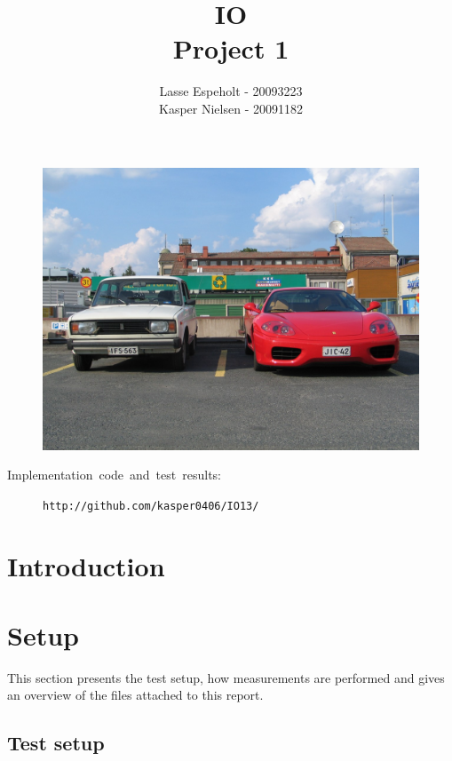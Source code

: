 \documentclass[a4paper,12pt]{article}
\begin{document}
\title{IO\\Project 1}

\author{Lasse Espeholt - 20093223\\
Kasper Nielsen - 20091182\\}

\maketitle
\begin{figure}[h!]
\includegraphics[width=\textwidth]{"images/forside"}
\end{figure}


\vfill{}
\begin{description}
\item [{Implementation~code~and~test~results:}]
\texttt{http://github.com/kasper0406/IO13/}
\end{description}
\pagebreak{}\tableofcontents{}\pagebreak{}

\section{Introduction}


\section{Setup}
This section presents the test setup, how measurements are performed
and gives an overview of the files attached to this report.

\subsection{Test setup}

\end{document}
